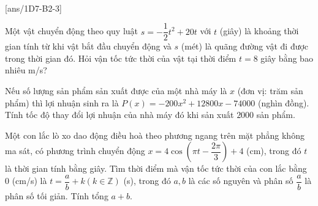 
 \\
[ans/1D7-B2-3]
\begin{ex}%
	Một vật chuyển động theo quy luật $s=-\dfrac{1}{2}t^2+20t$ với $t$ (giây) là khoảng thời gian tính từ khi vật bắt đầu chuyển động và $s$ (mét) là quãng đường vật đi được trong thời gian đó. Hỏi vận tốc tức thời của vật tại thời điểm $t=8$ giây bằng bao nhiêu m/s?
	\\
\end{ex}


\begin{ex}%
	Nếu số lượng sản phẩm sản xuất được của một nhà máy là $x$ (đơn vị: trăm sản phẩm) thì lợi nhuận sinh ra là $P(x)=-200x^2+ 12800x-74000$ (nghìn đồng). Tính tốc độ thay đổi lợi nhuận của nhà máy đó khi sản xuất  $2000$ sản phẩm.
	\\
\end{ex}

\begin{ex}%
	Một con lắc lò xo dao động điều hoà theo phương ngang trên mặt phẳng không ma sát, có phương trình chuyển động $x=4\cos \left(\pi t-\dfrac{2\pi}{3} \right)+4$ (cm), trong đó $t$ là thời gian tính bằng giây. Tìm thời điểm mà vận tốc tức thời của con lắc bằng $0$ (cm/s) là $t=\dfrac{a}{b}+k(k\in \mathbb{Z})$ (s), trong đó $a,b$ là các số nguyên và phân số $\dfrac{a}{b}$ là phân số tối giản. Tính tổng $a+b$.\\
\end{ex}

